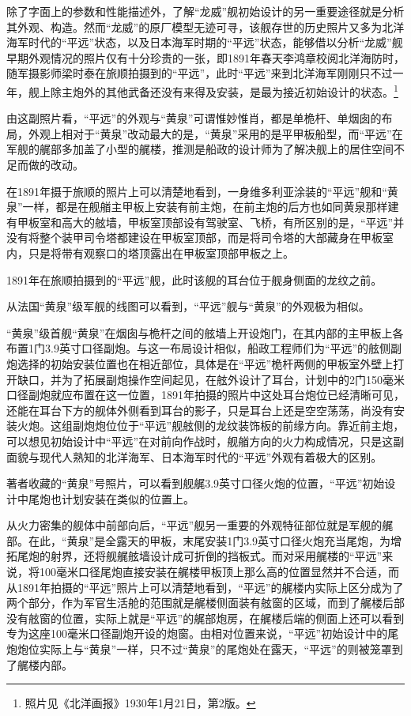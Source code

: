 \documentclass[12pt,UTF8]{ctexbook}
\begin{document}
除了字面上的参数和性能描述外，了解“龙威”舰初始设计的另一重要途径就是分析其外观、构造。然而“龙威”的原厂模型无迹可寻，该舰存世的历史照片又多为北洋海军时代的“平远”状态，以及日本海军时期的“平远”状态，能够借以分析“龙威”舰早期外观情况的照片仅有十分珍贵的一张，即1891年春天李鸿章校阅北洋海防时，随军摄影师梁时泰在旅顺拍摄到的“平远”，此时“平远”来到北洋海军刚刚只不过一年，舰上除主炮外的其他武备还没有来得及安装，是最为接近初始设计的状态。\footnote{照片见《北洋画报》1930年1月21日，第2版。}

由这副照片看，“平远”的外观与“黄泉”可谓惟妙惟肖，都是单桅杆、单烟囱的布局，外观上相对于“黄泉”改动最大的是，“黄泉”采用的是平甲板船型，而“平远”在军舰的艉部多加盖了小型的艉楼，推测是船政的设计师为了解决舰上的居住空间不足而做的改动。

在1891年摄于旅顺的照片上可以清楚地看到，一身维多利亚涂装的“平远”舰和“黄泉”一样，都是在舰艏主甲板上安装有前主炮，在前主炮的后方也如同黄泉那样建有甲板室和高大的舷墙，甲板室顶部设有驾驶室、飞桥，有所区别的是，“平远”并没有将整个装甲司令塔都建设在甲板室顶部，而是将司令塔的大部藏身在甲板室内，只是将带有观察口的塔顶露出在甲板室顶部甲板之上。

1891年在旅顺拍摄到的“平远”舰，此时该舰的耳台位于舰身侧面的龙纹之前。

从法国“黄泉”级军舰的线图可以看到，“平远”舰与“黄泉”的外观极为相似。

“黄泉”级首舰“黄泉”在烟囱与桅杆之间的舷墙上开设炮门，在其内部的主甲板上各布置1门3.9英寸口径副炮。与这一布局设计相似，船政工程师们为“平远”的舷侧副炮选择的初始安装位置也在相近部位，具体是在“平远”桅杆两侧的甲板室外壁上打开缺口，并为了拓展副炮操作空间起见，在舷外设计了耳台，计划中的2门150毫米口径副炮就应布置在这一位置，1891年拍摄的照片中这处耳台炮位已经清晰可见，还能在耳台下方的舰体外侧看到耳台的影子，只是耳台上还是空空荡荡，尚没有安装火炮。这组副炮炮位位于“平远”舰舷侧的龙纹装饰板的前缘方向。靠近前主炮，可以想见初始设计中“平远”在对前向作战时，舰艏方向的火力构成情况，只是这副面貌与现代人熟知的北洋海军、日本海军时代的“平远”外观有着极大的区别。

著者收藏的“黄泉”号照片，可以看到舰艉3.9英寸口径火炮的位置，“平远”初始设计中尾炮也计划安装在类似的位置上。

从火力密集的舰体中前部向后，“平远”舰另一重要的外观特征部位就是军舰的艉部。在此，“黄泉”是全露天的甲板，末尾安装1门3.9英寸口径火炮充当尾炮，为增拓尾炮的射界，还将舰艉舷墙设计成可折倒的挡板式。而对采用艉楼的“平远”来说，将100毫米口径尾炮直接安装在艉楼甲板顶上那么高的位置显然并不合适，而从1891年拍摄的“平远”照片上可以清楚地看到，“平远”的艉楼内实际上区分成为了两个部分，作为军官生活舱的范围就是艉楼侧面装有舷窗的区域，而到了艉楼后部没有舷窗的位置，实际上就是“平远”的艉部炮房，在艉楼后端的侧面上还可以看到专为这座100毫米口径副炮开设的炮窗。由相对位置来说，“平远”初始设计中的尾炮炮位实际上与“黄泉”一样，只不过“黄泉”的尾炮处在露天，“平远”的则被笼罩到了艉楼内部。
\end{document}
